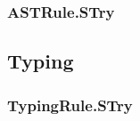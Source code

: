 \subsubsection{ASTRule.STry}
\begin{mathpar}
\end{mathpar}

\subsection{Typing}
\subsubsection{TypingRule.STry \label{sec:TypingRule.STry}}

